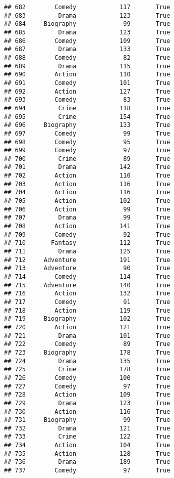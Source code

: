 \documentclass[
]{article}
\begin{document}
\begin{verbatim}
## 682        Comedy            117       True
## 683         Drama            123       True
## 684     Biography             99       True
## 685         Drama            123       True
## 686        Comedy            109       True
## 687         Drama            133       True
## 688        Comedy             82       True
## 689         Drama            115       True
## 690        Action            110       True
## 691        Comedy            101       True
## 692        Action            127       True
## 693        Comedy             83       True
## 694         Crime            118       True
## 695         Crime            154       True
## 696     Biography            133       True
## 697        Comedy             99       True
## 698        Comedy             95       True
## 699        Comedy             97       True
## 700         Crime             89       True
## 701         Drama            142       True
## 702        Action            110       True
## 703        Action            116       True
## 704        Action            116       True
## 705        Action            102       True
## 706        Action             99       True
## 707         Drama             99       True
## 708        Action            141       True
## 709        Comedy             92       True
## 710       Fantasy            112       True
## 711         Drama            125       True
## 712     Adventure            191       True
## 713     Adventure             90       True
## 714        Comedy            114       True
## 715     Adventure            140       True
## 716        Action            132       True
## 717        Comedy             91       True
## 718        Action            119       True
## 719     Biography            102       True
## 720        Action            121       True
## 721         Drama            101       True
## 722        Comedy             89       True
## 723     Biography            178       True
## 724         Drama            135       True
## 725         Crime            178       True
## 726        Comedy            100       True
## 727        Comedy             97       True
## 728        Action            109       True
## 729         Drama            123       True
## 730        Action            116       True
## 731     Biography             99       True
## 732         Drama            121       True
## 733         Crime            122       True
## 734        Action            104       True
## 735        Action            128       True
## 736         Drama            189       True
## 737        Comedy             97       True

\end{verbatim}
\end{document}
